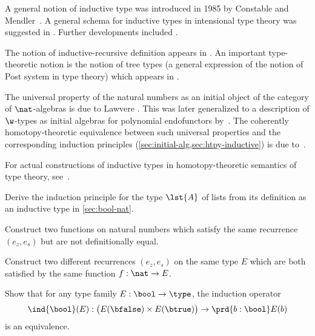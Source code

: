 A general notion of inductive type was introduced in 1985 by Constable and Mendler~\cite{DBLP:conf/lop/ConstableM85}.  A general schema for inductive types in intensional type theory was suggested in
\cite{PfenningPaulinMohring}.  Further developments included \cite{CoquandPaulin, Dybjer:1991}.

The notion of inductive-recursive definition appears in \cite{Dybjer:2000}. An important  type-theoretic notion is the notion of tree types (a general expression of the notion of Post system in type theory) which appears in \cite{PeterssonSynek}.

The universal property of the natural numbers as an initial object of the category of $\nat$-algebras is due to Lawvere \cite{lawvere:adjinfound}.
This was later generalized to a description of $\w$-types as initial algebras for polynomial endofunctors by~\cite{mp:wftrees}.
The coherently homotopy-theoretic equivalence between such universal properties and the corresponding induction principles (\autoref{sec:initial-alg,sec:htpy-inductive}) is due to~\cite{ags:it-hott}.

For actual constructions of inductive types in homotopy-theoretic semantics of type theory, see~\cite{klv:ssetmodel,mvdb:wtypes,ls:hits}.

\sectionExercises

\begin{ex}\label{ex:ind-lst}
  Derive the induction principle for the type $\lst{A}$ of lists from its definition as an inductive type in \autoref{sec:bool-nat}.
\end{ex}

\begin{ex}\label{ex:same-recurrence-not-defeq}
  Construct two functions on natural numbers which satisfy the same recurrence $(e_z, e_s)$ but are not definitionally equal.
\end{ex}

\begin{ex}\label{ex:one-function-two-recurrences}
  Construct two different recurrences $(e_z,e_s)$ on the same type $E$ which are both satisfied by the same function $f:\nat\to E$.
\end{ex}

\begin{ex}\label{ex:bool}
  Show that for any type family $E : \bool \to \type$, the induction operator
  \[ \ind{\bool}(E) : \big(E(\bfalse) \times E(\btrue)\big) \to \prd{b : \bool} E(b) \]
  is an equivalence.
\end{ex}

